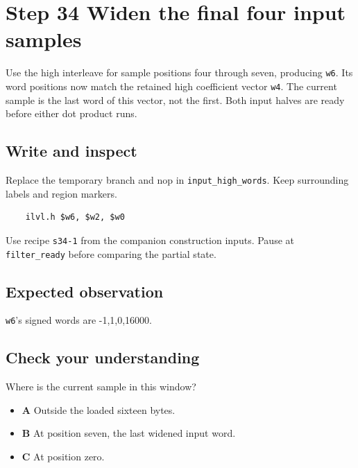 \section{Step 34 Widen the final four input samples}\label{fir-s34}

Use the high interleave for sample positions four through seven, producing \texttt{w6}. Its word positions now match the retained high coefficient vector \texttt{w4}. The current sample is the last word of this vector, not the first. Both input halves are ready before either dot product runs.

\subsection{Write and inspect}
Replace the temporary branch and nop in \texttt{input\_high\_words}. Keep surrounding labels and region markers.

\begin{verbatim}
    ilvl.h $w6, $w2, $w0
\end{verbatim}
Use recipe \texttt{s34-1} from the companion construction inputs. Pause at \texttt{filter\_ready} before comparing the partial state.

\subsection{Expected observation}
\texttt{w6}’s signed words are -1,1,0,16000.

\subsection{Check your understanding}
Where is the current sample in this window?

\begin{itemize}
\item \textbf{A} Outside the loaded sixteen bytes.
\item \textbf{B} At position seven, the last widened input word.
\item \textbf{C} At position zero.
\end{itemize}
